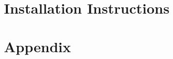 \clearpage
\section{Installation Instructions}
\label{sect:installation}


\clearpage
\section{Appendix}
\label{sect:appendix}



%
%


